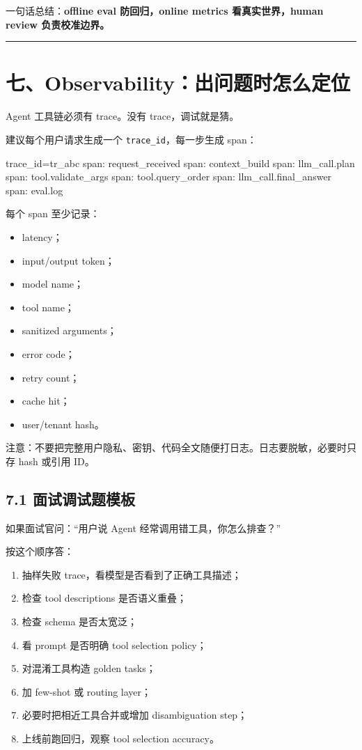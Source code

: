 一句话总结：\textbf{offline eval 防回归，online metrics 看真实世界，human review 负责校准边界。}


\bigskip\hrule\bigskip

\section{七、Observability：出问题时怎么定位}

Agent 工具链必须有 trace。没有 trace，调试就是猜。


建议每个用户请求生成一个 \texttt{trace\_id}，每一步生成 span：


\begin{codeblock}
trace_id=tr_abc
  span: request_received
  span: context_build
  span: llm_call.plan
  span: tool.validate_args
  span: tool.query_order
  span: llm_call.final_answer
  span: eval.log
\end{codeblock}

每个 span 至少记录：


\begin{itemize}[leftmargin=2em]
\item latency；
\item input/output token；
\item model name；
\item tool name；
\item sanitized arguments；
\item error code；
\item retry count；
\item cache hit；
\item user/tenant hash。
\end{itemize}

注意：不要把完整用户隐私、密钥、代码全文随便打日志。日志要脱敏，必要时只存 hash 或引用 ID。


\subsection{7.1 面试调试题模板}

如果面试官问：``用户说 Agent 经常调用错工具，你怎么排查？''


按这个顺序答：


\begin{enumerate}[leftmargin=2em]
\item 抽样失败 trace，看模型是否看到了正确工具描述；
\item 检查 tool descriptions 是否语义重叠；
\item 检查 schema 是否太宽泛；
\item 看 prompt 是否明确 tool selection policy；
\item 对混淆工具构造 golden tasks；
\item 加 few-shot 或 routing layer；
\item 必要时把相近工具合并或增加 disambiguation step；
\item 上线前跑回归，观察 tool selection accuracy。
\end{enumerate}

